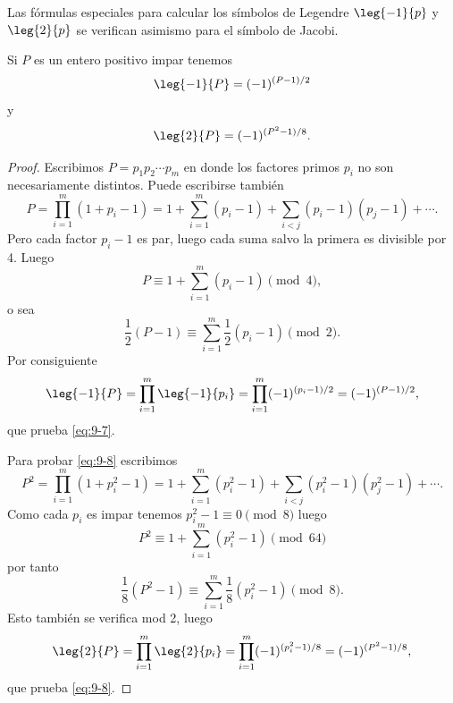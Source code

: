 \documentclass[12pt,a4paper]{book}
\begin{document}
    Las fórmulas especiales para calcular los símbolos de Legendre $\leg{-1}{p}$ y
    $\leg{2}{p}$ se verifican asimismo para el símbolo de Jacobi.

    \begin{teorema}\label{teo:9-10}
        Si $P$ es un entero positivo impar tenemos
        \begin{equation}\label{eq:9-7}
            \leg{-1}{P}=(-1)^{(P-1)/2}
        \end{equation}
        y
        \begin{equation}\label{eq:9-8}
            \leg{2}{P}=(-1)^{(P^{2}-1)/8}.
        \end{equation}
    \end{teorema}

    \begin{proof}
        Escribimos $P=p_{1}p_{2}\cdots p_{m}$ en donde los factores primos $p_{i}$ no son
        necesariamente distintos. Puede escribirse también
        \begin{equation*}
            P=\prod_{i=1}^{m}(1+p_{i}-1)=1+\sum_{i=1}^{m}(p_{i}-1)+\sum_{i<j}(p_{i}-1)(p_{j}-1)+\cdots.
        \end{equation*}
        Pero cada factor $p_{i}-1$ es par, luego cada suma salvo la primera es divisible por
        4. Luego
        \begin{equation*}
            P\equiv1+\sum_{i=1}^{m}(p_{i}-1)\pmod{4},
        \end{equation*}
        o sea
        \begin{equation*}
            \frac{1}{2}(P-1)\equiv\sum_{i=1}^{m}\frac{1}{2}(p_{i}-1)\pmod{2}.
        \end{equation*}
        Por consiguiente
        \begin{equation*}
            \leg{-1}{P}=\prod_{i=1}^{m}\leg{-1}{p_{i}}=\prod_{i=1}^{m}(-1)^{(p_{i}-1)/2}=(-1)^{(P-1)/2},
        \end{equation*}
        que prueba \eqref{eq:9-7}.

        Para probar \eqref{eq:9-8} escribimos
        \begin{equation*}
            P^{2}=\prod_{i=1}^{m}(1+p_{i}^{2}-1)=1+\sum_{i=1}^{m}(p_{i}^{2}-1)+\sum_{i<j}(p_{i}^{2}-1)(p_{j}^{2}-1)+\cdots.
        \end{equation*}
        Como cada $p_{i}$ es impar tenemos $p_{i}^{2}-1\equiv0\pmod{8}$ luego
        \begin{equation*}
            P^{2}\equiv1+\sum_{i=1}^{m}(p_{i}^{2}-1)\pmod{64}
        \end{equation*}
        por tanto
        \begin{equation*}
            \frac{1}{8}(P^{2}-1)\equiv\sum_{i=1}^{m}\frac{1}{8}(p_{i}^{2}-1)\pmod{8}.
        \end{equation*}
        Esto también se verifica mod 2, luego
        \begin{equation*}
            \leg{2}{P}=\prod_{i=1}^{m}\leg{2}{p_{i}}=\prod_{i=1}^{m}(-1)^{(p_{i}^{2}-1)/8}=(-1)^{(P^{2}-1)/8},
        \end{equation*}
        que prueba \eqref{eq:9-8}.
    \end{proof}
\end{document}
